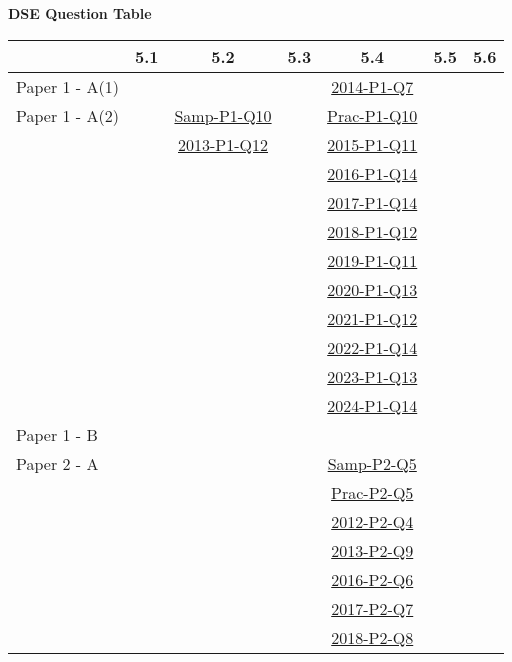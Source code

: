\documentclass[12pt, a4paper]{article}
\begin{document}
\begin{absolutelynopagebreak}
\begin{center}
\textbf{DSE Question Table}
\end{center}
\begin{center}
\begin{tabular}{|l|c|c|c|c|c|c|}
\hline
        & 5.1 & 5.2 & 5.3 & 5.4 & 5.5 & 5.6 \\\hline
\hline
Paper 1 - A(1)&  &  &  & \hyperref[DSE2014-CoreP1-Q07]{2014-P1-Q7} &  &  \\
\hline
Paper 1 - A(2)&  & \hyperref[DSE2012S-CoreP1-Q10]{Samp-P1-Q10} &  & \hyperref[DSE2012P-CoreP1-Q10]{Prac-P1-Q10} &  &  \\
&  & \hyperref[DSE2013-CoreP1-Q12]{2013-P1-Q12} &  & \hyperref[DSE2015-CoreP1-Q11]{2015-P1-Q11} &  &  \\
&  &  &  & \hyperref[DSE2016-CoreP1-Q14]{2016-P1-Q14} &  &  \\
&  &  &  & \hyperref[DSE2017-CoreP1-Q14]{2017-P1-Q14} &  &  \\
&  &  &  & \hyperref[DSE2018-CoreP1-Q12]{2018-P1-Q12} &  &  \\
&  &  &  & \hyperref[DSE2019-CoreP1-Q11]{2019-P1-Q11} &  &  \\
&  &  &  & \hyperref[DSE2020-CoreP1-Q13]{2020-P1-Q13} &  &  \\
&  &  &  & \hyperref[DSE2021-CoreP1-Q12]{2021-P1-Q12} &  &  \\
&  &  &  & \hyperref[DSE2022-CoreP1-Q14]{2022-P1-Q14} &  &  \\
&  &  &  & \hyperref[DSE2023-CoreP1-Q13]{2023-P1-Q13} &  &  \\
&  &  &  & \hyperref[DSE2024-CoreP1-Q14]{2024-P1-Q14} &  &  \\
\hline
Paper 1 - B&  &  &  &  &  &  \\
\hline
\hline
Paper 2 - A&  &  &  & \hyperref[DSE2012S-CoreP2-Q05]{Samp-P2-Q5} &  &  \\
&  &  &  & \hyperref[DSE2012P-CoreP2-Q05]{Prac-P2-Q5} &  &  \\
&  &  &  & \hyperref[DSE2012-CoreP2-Q04]{2012-P2-Q4} &  &  \\
&  &  &  & \hyperref[DSE2013-CoreP2-Q09]{2013-P2-Q9} &  &  \\
&  &  &  & \hyperref[DSE2016-CoreP2-Q06]{2016-P2-Q6} &  &  \\
&  &  &  & \hyperref[DSE2017-CoreP2-Q07]{2017-P2-Q7} &  &  \\
&  &  &  & \hyperref[DSE2018-CoreP2-Q08]{2018-P2-Q8} &  &  \\

\end{tabular}
\end{center}
\end{absolutelynopagebreak}
\end{document}

